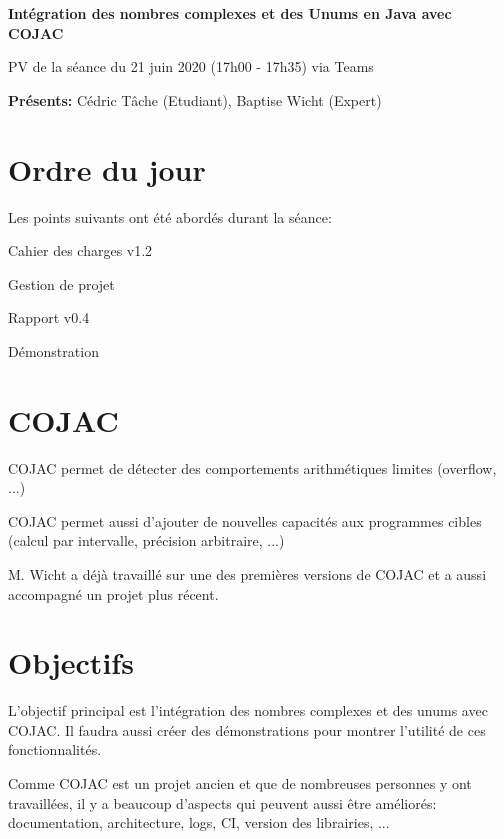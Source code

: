 \documentclass[11pt]{meetingmins}
\date{21 juin 2021}
\begin{document}
\begin {center} {
    \large \textbf {Intégration des nombres complexes et des Unums en Java avec COJAC}
}
\vspace {0.5ex}

PV de la séance du 21 juin 2020 (17h00 - 17h35) via Teams
\end {center} \vspace {1.5em}

\noindent
\textbf{Présents:} Cédric Tâche (Etudiant), Baptise Wicht (Expert)

\section{Ordre du jour}
Les points suivants ont été abordés durant la séance:
\begin{hiddenitems}
    \item Cahier des charges v1.2
    \item Gestion de projet
    \item Rapport v0.4
    \item Démonstration
\end{hiddenitems}

\section{COJAC}
\begin{hiddenitems}
    \item COJAC permet de détecter des comportements arithmétiques limites (overflow, ...)
    \item COJAC permet aussi d'ajouter de nouvelles capacités aux programmes cibles (calcul par intervalle, précision arbitraire, ...)
    \item M. Wicht a déjà travaillé sur une des premières versions de COJAC et a aussi accompagné un projet plus récent.
\end{hiddenitems}

\section{Objectifs}
\begin{hiddenitems}
    \item L'objectif principal est l'intégration des nombres complexes et des unums avec COJAC. Il faudra aussi créer des démonstrations pour montrer l'utilité de ces fonctionnalités.
    \item Comme COJAC est un projet ancien et que de nombreuses personnes y ont travaillées, il y a beaucoup d'aspects qui peuvent aussi être améliorés: documentation, architecture, logs, CI, version des librairies, ...
\end{hiddenitems}
\end{document}
